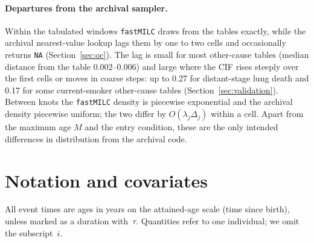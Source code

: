 \documentclass[11pt]{article}
\newcommand{\code}[1]{\texttt{#1}}
\begin{document}
\paragraph{Departures from the archival sampler.} Within the tabulated windows
\code{fastMILC} draws from the tables exactly, while the archival nearest-value
lookup lags them by one to two cells and occasionally returns \code{NA}
(Section~\ref{sec:oc}). The lag is small for most other-cause tables (median
distance from the table 0.002--0.006) and large where the CIF rises steeply
over the first cells or moves in coarse steps: up to 0.27 for distant-stage
lung death and 0.17 for some current-smoker other-cause tables
(Section~\ref{sec:validation}). Between knots the \code{fastMILC} density is
piecewise exponential and the archival density piecewise uniform; the two
differ by $O(\lambda_j\Delta_j)$ within a cell. Apart from the maximum age $M$
and the entry condition, these are the only intended differences in
distribution from the archival code.

\section{Notation and covariates}\label{sec:notation}

All event times are ages in years on the attained-age scale (time since birth),
unless marked as a duration with~$\tau$. Quantities refer to one individual; we
omit the subscript~$i$.
\end{document}
